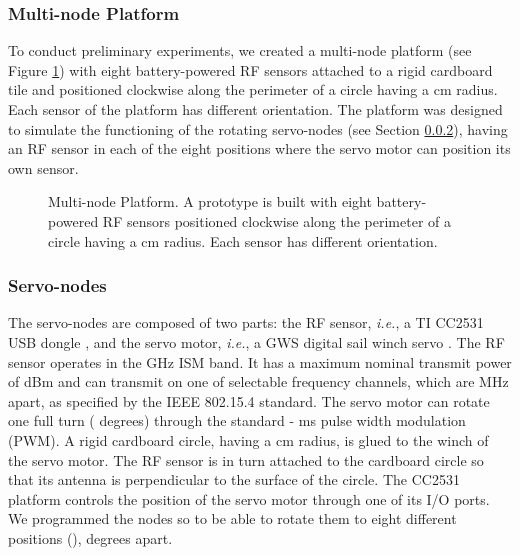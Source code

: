 \documentclass[conference]{IEEEtran}
\begin{document}
\subsubsection{Multi-node Platform}
\label{sec:multi_node_platform}

To conduct preliminary experiments, we created a multi-node platform (see Figure \ref{fig:cardboard_nodes}) with eight battery-powered RF sensors attached to a rigid cardboard tile and positioned clockwise along the perimeter of a circle having a  cm radius. Each sensor of the platform has different orientation. The platform was designed to simulate the functioning of the rotating servo-nodes (see Section \ref{sec:servo_nodes}), having an RF sensor in each of the eight positions where the servo motor can position its own sensor.

\begin{figure}[t]
    \begin{center}
        \caption{Multi-node Platform. A prototype is built with eight battery-powered RF sensors positioned clockwise along the perimeter of a circle having a  cm radius. Each sensor has different orientation.}
        \label{fig:cardboard_nodes}
    \end{center}
\end{figure}

\subsubsection{Servo-nodes}
\label{sec:servo_nodes}

The servo-nodes are composed of two parts: the RF sensor, \emph{i.e.}, a TI CC2531 USB dongle \cite{tidongle}, and the servo motor, \emph{i.e.}, a GWS digital sail winch servo \cite{GWS125_servo}. The RF sensor operates in the  GHz ISM band. It has a maximum nominal transmit power of  dBm and can transmit on one of  selectable frequency channels, which are  MHz apart, as specified by the IEEE 802.15.4 standard. The servo motor can rotate one full turn ( degrees) through the standard - ms pulse width modulation (PWM). A rigid cardboard circle, having a  cm radius, is glued to the winch of the servo motor. The RF sensor is in turn attached to the cardboard circle so that its antenna is perpendicular to the surface of the circle. The CC2531 platform controls the position of the servo motor through one of its I/O ports. We programmed the nodes so to be able to rotate them to eight different positions (),  degrees apart.
\end{document}
